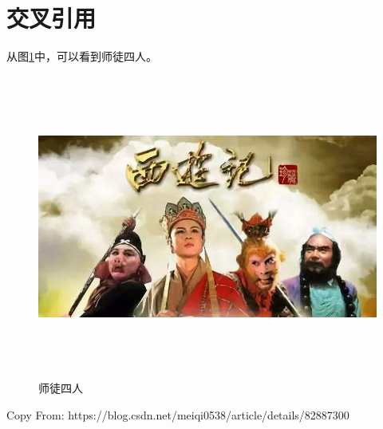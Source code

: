 \documentclass{article} %
\begin{document}
\section{交叉引用}
从图\ref{fig:fourp}中，可以看到师徒四人。
\begin{figure}[htbp]
\centering
\includegraphics[height=10cm]{images/xiyouji.jpeg}
\caption{师徒四人}
\label{fig:fourp}
\end{figure}

Copy From: https://blog.csdn.net/meiqi0538/article/details/82887300
\end{document}

